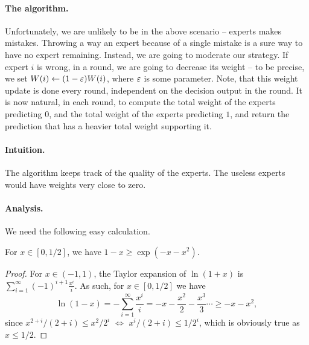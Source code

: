 \paragraph*{The algorithm.}
Unfortunately, we are unlikely to be in the above scenario -- experts
makes mistakes. Throwing a way an expert because of a single mistake
is a sure way to have no expert remaining. Instead, we are going to
moderate our strategy. If expert $i$ is wrong, in a round, we are
going to decrease its weight -- to be precise, we set
$W(i) \leftarrow (1-{\varepsilon})W(i)$, where ${\varepsilon}$ is some parameter.  Note,
that this weight update is done every round, independent on the
decision output in the round.  It is now natural, in each round, to
compute the total weight of the experts predicting $0$, and the total
weight of the experts predicting $1$, and return the prediction that
has a heavier total weight supporting it.

\paragraph*{Intuition.}

The algorithm keeps track of the quality of the experts. The useless
experts would have weights very close to zero.

\paragraph*{Analysis.}
We need the following easy calculation.

\begin{lemma}
    For $x \in [0,1/2]$, we have $1-x \geq \exp( -x -x^2 )$.
\end{lemma}
\begin{proof}
    For $x \in (-1, 1)$, the Taylor expansion of $\ln(1+x)$ is
    $ \sum_{i=1}^\infty (-1)^{i+1} \frac{x^i}{i}$. As such, for $x \in
    [0,1/2]$ we have
    \begin{equation*}
        \ln (1-x) =
        -  \sum_{i=1}^\infty \frac{x^i}{i}
        =%
        -x - \frac{x^2}{2} - \frac{x^3}{3} \cdots
        \geq
        -x - x^2,
    \end{equation*}
    since $x^{2+i}/(2+i) \leq x^2 /2^i$ $\iff$
    $x^{i}/(2+i) \leq 1 /2^i$, which is obviously true as
    $x \leq 1/2$.
\end{proof}


\newcommand{\Mistakes}{\boldsymbol \beta}%
\newcommand{\mistakes}{\beta}

\newcommand{\MistakesX}[1]{\Mistakes_{#1}}
\newcommand{\mistakesY}[2]{\beta_{#1}\pth{#2}}

